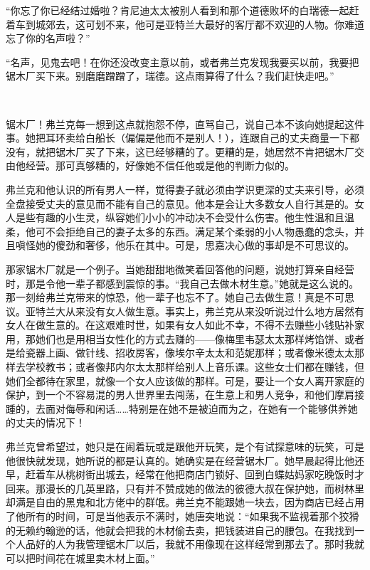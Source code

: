 \par “你忘了你已经结过婚啦？肯尼迪太太被别人看到和那个道德败坏的白瑞德一起赶着车到城郊去，这可划不来，他可是亚特兰大最好的客厅都不欢迎的人物。你难道忘了你的名声啦？”
\par “名声，见鬼去吧！在你还没改变主意以前，或者弗兰克发现我要买以前，我要把锯木厂买下来。别磨磨蹭蹭了，瑞德。这点雨算得了什么？我们赶快走吧。”
\par  
\par 锯木厂！弗兰克每一想到这点就抱怨不停，直骂自己，说自己本不该向她提起这件事。她把耳环卖给白船长（偏偏是他而不是别人！），连跟自己的丈夫商量一下都没有，就把锯木厂买了下来，这已经够糟的了。更糟的是，她居然不肯把锯木厂交由他经营。那可真够糟的，好像她不信任他或是他的判断力似的。
\par 弗兰克和他认识的所有男人一样，觉得妻子就必须由学识更深的丈夫来引导，必须全盘接受丈夫的意见而不能有自己的意见。他本是会让大多数女人自行其是的。女人是些有趣的小生灵，纵容她们小小的冲动决不会受什么伤害。他生性温和且温柔，他可不会拒绝自己的妻子太多的东西。满足某个柔弱的小人物愚蠢的念头，并且嗔怪她的傻劲和奢侈，他乐在其中。可是，思嘉决心做的事却是不可思议的。
\par 那家锯木厂就是一个例子。当她甜甜地微笑着回答他的问题，说她打算亲自经营时，那是令他一辈子都感到震惊的事。“我自己去做木材生意。”她就是这么说的。那一刻给弗兰克带来的惊恐，他一辈子也忘不了。她自己去做生意！真是不可思议。亚特兰大从来没有女人做生意。事实上，弗兰克从来没听说过什么地方居然有女人在做生意的。在这艰难时世，如果有女人如此不幸，不得不去赚些小钱贴补家用，那她们也是用相当女性化的方式去赚的——像梅里韦瑟太太那样烤馅饼、或者是给瓷器上画、做针线、招收房客，像埃尔辛太太和范妮那样；或者像米德太太那样去学校教书；或者像邦内尔太太那样给别人上音乐课。这些女士们都在赚钱，但她们全都待在家里，就像一个女人应该做的那样。可是，要让一个女人离开家庭的保护，到一个不容易混的男人世界里去闯荡，在生意上和男人竞争，和他们摩肩接踵的，去面对侮辱和闲话……特别是在她不是被迫而为之，在她有一个能够供养她的丈夫的情况下！
\par 弗兰克曾希望过，她只是在闹着玩或是跟他开玩笑，是个有试探意味的玩笑，可是他很快就发现，她所说的都是认真的。她确实是在经营锯木厂。她早晨起得比他还早，赶着车从桃树街出城去，经常在他把商店门锁好、回到白蝶姑妈家吃晚饭时才回来。那漫长的几英里路，只有并不赞成她的做法的彼德大叔在保护她，而树林里却满是自由的黑鬼和北方佬中的群氓。弗兰克不能跟她一块去，因为商店已经占用了他所有的时间，可是当他表示不满时，她唐突地说：“如果我不监视着那个狡猾的无赖约翰逊的话，他就会把我的木材偷去卖，把钱装进自己的腰包。在我找到一个人品好的人为我管理锯木厂以后，我就不用像现在这样经常到那去了。那时我就可以把时间花在城里卖木材上面。”
